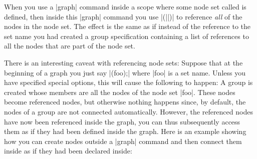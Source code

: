 When you use a |graph| command inside a scope where some node set
called  is defined, then inside this |graph| command
you use |(||)| to reference \emph{all} of the nodes in
the node set. The effect is the same as if instead of the reference to
the set name you had created a group specification containing a list
of references to all the nodes that are part of the node set.

\begin{codeexample}[]
\end{codeexample}

There is an interesting caveat with referencing node sets: Suppose
that at the beginning of a graph you just say |(foo);| where |foo| is
a set name. Unless you have specified special options, this will cause
the following to happen: A group is created whose members are all the
nodes of the node set |foo|. These nodes become referenced nodes, but
otherwise nothing happens since, by default, the nodes of a group are
not connected automatically. However, the referenced nodes have now
been referenced inside the graph, you can thus subsequently access
them as if they had been defined inside the graph. Here is an example
showing how you can create nodes outside a |graph| command and then
connect them inside as if they had been declared inside:

\begin{codeexample}[]
\end{codeexample}


